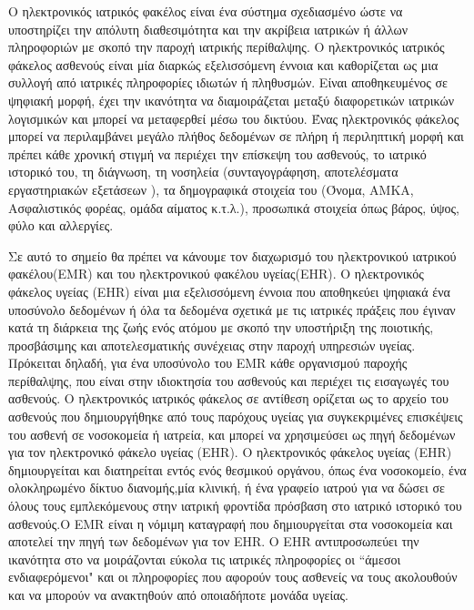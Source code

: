 		Ο ηλεκτρονικός ιατρικός φακέλος είναι ένα σύστημα σχεδιασμένο ώστε να υποστηρίζει την απόλυτη διαθεσιμότητα και την ακρίβεια ιατρικών ή άλλων πληροφοριών με σκοπό την παροχή ιατρικής περίθαλψης. Ο ηλεκτρονικός ιατρικός φάκελος ασθενούς είναι μία διαρκώς εξελισσόμενη έννοια και καθορίζεται ως μια συλλογή από ιατρικές πληροφορίες ιδιωτών ή πληθυσμών. Είναι αποθηκευμένος σε ψηφιακή μορφή, έχει την ικανότητα να διαμοιράζεται μεταξύ διαφορετικών ιατρικών λογισμικών και μπορεί να μεταφερθεί μέσω του δικτύου. Ένας ηλεκτρονικός φάκελος μπορεί να περιλαμβάνει μεγάλο πλήθος δεδομένων σε πλήρη ή περιληπτική μορφή και πρέπει κάθε χρονική στιγμή να περιέχει την επίσκεψη του ασθενούς, το ιατρικό ιστορικό του, τη διάγνωση, τη νοσηλεία (συνταγογράφηση, αποτελέσματα εργαστηριακών εξετάσεων ), τα δημογραφικά στοιχεία του (Όνομα, ΑΜΚΑ, Ασφαλιστικός φορέας, ομάδα αίματος κ.τ.λ.),  προσωπικά στοιχεία όπως βάρος, ύψος, φύλο και αλλεργίες.
		
		Σε αυτό το σημείο θα πρέπει να κάνουμε τον διαχωρισμό του ηλεκτρονικού ιατρικού φακέλου(EMR) και του ηλεκτρονικού φακέλου υγείας(EHR). O ηλεκτρονικός φάκελος υγείας (EHR) είναι μια εξελισσόμενη έννοια που αποθηκεύει ψηφιακά ένα υποσύνολο δεδομένων ή όλα τα δεδομένα σχετικά με τις ιατρικές πράξεις που έγιναν κατά τη διάρκεια της ζωής ενός ατόμου με σκοπό την υποστήριξη της ποιοτικής, προσβάσιμης και αποτελεσματικής συνέχειας στην παροχή υπηρεσιών υγείας. Πρόκειται δηλαδή, για ένα υποσύνολο του EMR κάθε οργανισμού παροχής περίθαλψης, που είναι στην ιδιοκτησία του ασθενούς και περιέχει τις εισαγωγές του ασθενούς. Ο ηλεκτρονικός ιατρικός φάκελος σε αντίθεση ορίζεται ως το αρχείο του ασθενούς που δημιουργήθηκε από τους παρόχους υγείας για συγκεκριμένες επισκέψεις του ασθενή σε νοσοκομεία ή ιατρεία, και μπορεί να χρησιμεύσει ως πηγή δεδομένων για τον ηλεκτρονικό φάκελο υγείας (EHR). Ο ηλεκτρονικός φάκελος υγείας (EHR) δημιουργείται και διατηρείται εντός ενός θεσμικού οργάνου, όπως ένα νοσοκομείο, ένα ολοκληρωμένο δίκτυο διανομής,μία κλινική, ή ένα γραφείο ιατρού για να δώσει σε όλους τους εμπλεκόμενους στην ιατρική φροντίδα πρόσβαση στο ιατρικό ιστορικό του ασθενούς\cite{Gunter2005}.Ο EMR είναι η νόμιμη καταγραφή που δημιουργείται στα νοσοκομεία και αποτελεί την πηγή των δεδομένων για τον EΗR. Ο EHR αντιπροσωπεύει την ικανότητα στο να μοιράζονται εύκολα τις ιατρικές
πληροφορίες οι ``άμεσοι ενδιαφερόμενοι" και οι πληροφορίες που αφορούν τους ασθενείς να τους ακολουθούν και να μπορούν να ανακτηθούν από οποιαδήποτε μονάδα υγείας. 

